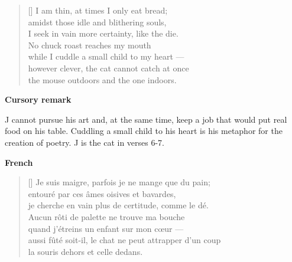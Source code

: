 \documentclass[a4paper,12pt,twoside,final]{book}
\begin{document}
\newpage



\settowidth{\versewidth}{however clever, the cat cannot catch at once}

\begin{verse}[\versewidth]
  I am thin, at times I only eat bread; \\
  amidst those idle and blithering souls, \\
  I seek in vain more certainty, like the die. \\
  No chuck roast reaches my mouth \\
  while I cuddle a small child to my heart --- \\
  however clever, the cat cannot catch at once \\
  the mouse outdoors and the one indoors. \\
\end{verse}

\bigskip

\noindent \textbf{Cursory remark}

\medskip

J cannot pursue his art and, at the same time, keep a job that would
put real food on his table. Cuddling a small child to his heart is his
metaphor for the creation of poetry. J is the cat in verses 6-7.

\bigskip

\noindent \textbf{French}


\settowidth{\versewidth}{aussi fûté soit-il, le chat ne peut attrapper d'un coup}

\begin{verse}[\versewidth]
  Je suis maigre, parfois je ne mange que du pain; \\
  entouré par ces âmes oisives et bavardes, \\
  je cherche en vain plus de certitude, comme le dé. \\
  Aucun rôti de palette ne trouve ma bouche \\
  quand j'étreins un enfant sur mon cœur --- \\
  aussi fûté soit-il, le chat ne peut attrapper d'un coup \\
  la souris dehors et celle dedans. \\
\end{verse}

\bigskip
\end{document}
